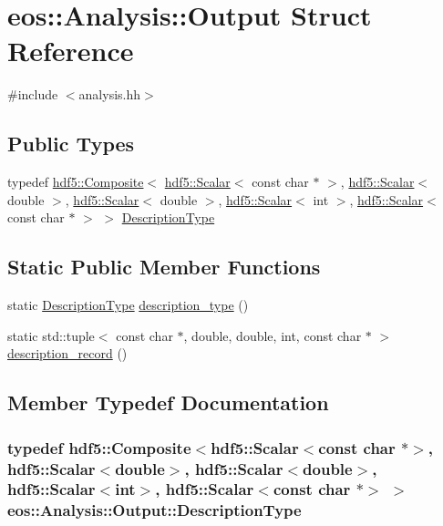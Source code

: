 \hypertarget{structeos_1_1Analysis_1_1Output}{
\section{eos::Analysis::Output Struct Reference}
\label{structeos_1_1Analysis_1_1Output}
}


{\ttfamily \#include $<$analysis.hh$>$}\subsection*{Public Types}
\begin{DoxyCompactItemize}
\item 
typedef \hyperlink{classeos_1_1hdf5_1_1Composite}{hdf5::Composite}$<$ \hyperlink{classeos_1_1hdf5_1_1Scalar}{hdf5::Scalar}$<$ const char $\ast$ $>$, \hyperlink{classeos_1_1hdf5_1_1Scalar}{hdf5::Scalar}$<$ double $>$, \hyperlink{classeos_1_1hdf5_1_1Scalar}{hdf5::Scalar}$<$ double $>$, \hyperlink{classeos_1_1hdf5_1_1Scalar}{hdf5::Scalar}$<$ int $>$, \hyperlink{classeos_1_1hdf5_1_1Scalar}{hdf5::Scalar}$<$ const char $\ast$ $>$ $>$ \hyperlink{structeos_1_1Analysis_1_1Output_a87e1877031ee1d537773b3dad303dd87}{DescriptionType}
\end{DoxyCompactItemize}
\subsection*{Static Public Member Functions}
\begin{DoxyCompactItemize}
\item 
static \hyperlink{classeos_1_1hdf5_1_1Composite}{DescriptionType} \hyperlink{structeos_1_1Analysis_1_1Output_afe79cdeca03867008ffebb0796600b6a}{description\_\-type} ()
\item 
static std::tuple$<$ const char $\ast$, double, double, int, const char $\ast$ $>$ \hyperlink{structeos_1_1Analysis_1_1Output_aef0dc96dd006ae72050dc34ac745df15}{description\_\-record} ()
\end{DoxyCompactItemize}


\subsection{Member Typedef Documentation}
\hypertarget{structeos_1_1Analysis_1_1Output_a87e1877031ee1d537773b3dad303dd87}{
\subsubsection[{DescriptionType}]{\setlength{\rightskip}{0pt plus 5cm}typedef {\bf hdf5::Composite}$<${\bf hdf5::Scalar}$<$const char $\ast$$>$, {\bf hdf5::Scalar}$<$double$>$, {\bf hdf5::Scalar}$<$double$>$, {\bf hdf5::Scalar}$<$int$>$, {\bf hdf5::Scalar}$<$const char $\ast$$>$ $>$ {\bf eos::Analysis::Output::DescriptionType}}}
\label{structeos_1_1Analysis_1_1Output_a87e1877031ee1d537773b3dad303dd87}


